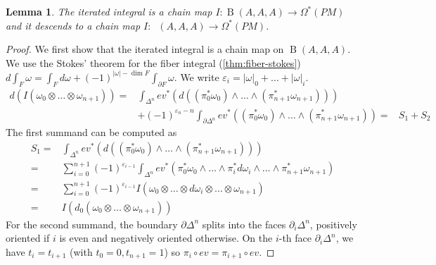 \documentclass{scrartcl}
\theoremstyle{plain}
\newtheorem{lemma}[theorem]{Lemma}
\theoremstyle{definition}
\renewcommand{\epsilon}{\varepsilon}
\newcommand{\abs}[1]{\left\lvert#1\right\rvert}
\DeclareMathOperator{\BC}{B}
\DeclareMathOperator{\nBC}{\hat B}
\newcommand{\comp}{\mathbin{\circ}}
\begin{document}
\begin{lemma}\label{lem:integral-chain-map}
    The iterated integral is a chain map $I\colon \BC(A, A, A)\to \Omega^*(PM)$ and it descends to a chain map $I\colon \nBC(A, A, A)\to \Omega^*(PM)$. %
\end{lemma}
\begin{proof}
    We first show that the iterated integral is a chain map on $\BC(A, A, A)$. We use the Stokes' theorem for the fiber integral (\cref{thm:fiber-stokes}) $d\int_{F} \omega = \int_{F}d\omega + (-1)^{\abs{\omega} - \dim F} \int_{\partial F}\omega$. We write $\epsilon_i = \abs\omega_0+\dots+\abs\omega_i$.
    \begin{align*}
        d\left(I\left( \omega_0\otimes\dots\otimes\omega_{n+1}\right)\right) =& \int_{\Delta^n} ev^*\left(d\left((\pi_0^*\omega_0)\wedge\dots\wedge(\pi_{n+1}^*\omega_{n+1})\right)\right) \\&
        + (-1)^{\epsilon_n - n} \int_{\partial\Delta^n} ev^*\left((\pi_0^*\omega_0)\wedge\dots\wedge(\pi_{n+1}^*\omega_{n+1})\right) 
        =& S_1 + S_2
    \end{align*}
    The first summand can be computed as  
    \begin{align*}
        S_1 =&\int_{\Delta^n} ev^*\left(d\left((\pi_0^*\omega_0)\wedge\dots\wedge(\pi_{n+1}^*\omega_{n+1})\right)\right) \\
        =&\sum_{i=0}^{n+1} (-1)^{\epsilon_{i-1}}\int_{\Delta^n} ev^*\left(\pi_0^*\omega_0 \wedge \dots\wedge \pi_i^*d\omega_i\wedge\dots\wedge\pi_{n+1}^*\omega_{n+1}\right)\\
        =& \sum_{i=0}^{n+1} (-1)^{\epsilon_{i-1}} I\left(\omega_0\otimes\dots \otimes d\omega_i\otimes\dots\otimes\omega_{n+1}\right) \\
        =& I(d_0(\omega_0\otimes\dots \otimes \omega_{n+1}))
    \end{align*}
    For the second summand, the boundary $\partial \Delta^n$ splits into the faces $\partial_i\Delta^n$, positively oriented if $i$ is even and negatively oriented otherwise. On the $i$-th face $\partial_i\Delta^n$, we have $t_i=t_{i+1}$ (with $t_0=0, t_{n+1}=1$) so $\pi_i\comp ev=\pi_{i+1}\comp ev$.


\end{proof}
\end{document}
